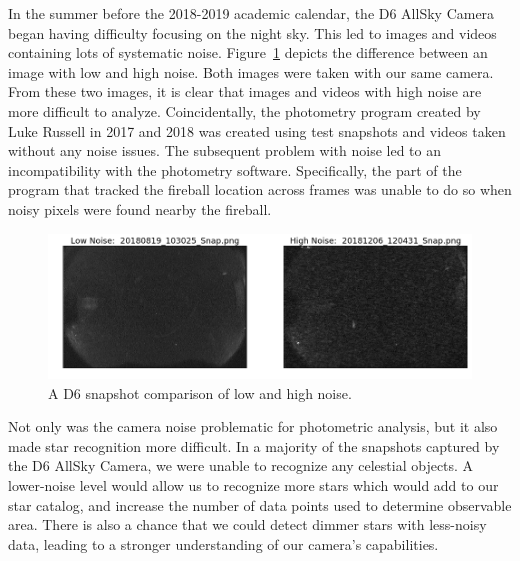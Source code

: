 In the summer before the 2018-2019 academic calendar, the D6 AllSky Camera began having difficulty focusing on the night sky.
This led to images and videos containing lots of systematic noise.  
Figure~\ref{camera_noise} depicts the difference between an image with low and high noise.
Both images were taken with our same camera.
From these two images, it is clear that images and videos with high noise are more difficult to analyze.
Coincidentally, the photometry program created by Luke Russell in 2017 and 2018 was created using test snapshots and videos taken without any noise issues.
The subsequent problem with noise led to an incompatibility with the photometry software.
Specifically, the part of the program that tracked the fireball location across frames was unable to do so when noisy pixels were found nearby the fireball.

\begin{figure}[ht!]
  \centering
  \includegraphics[scale=0.5]{images/low_and_high_noise.png}
  \caption{A D6 snapshot comparison of low and high noise. }
  \label{camera_noise}
\end{figure}

Not only was the camera noise problematic for photometric analysis, but it also made star recognition more difficult.
In a majority of the snapshots captured by the D6 AllSky Camera, we were unable to recognize any celestial objects.
A lower-noise level would allow us to recognize more stars which would add to our star catalog, and increase the number of data points used to determine observable area.
There is also a chance that we could detect dimmer stars with less-noisy data, leading to a stronger understanding of our camera's capabilities.

